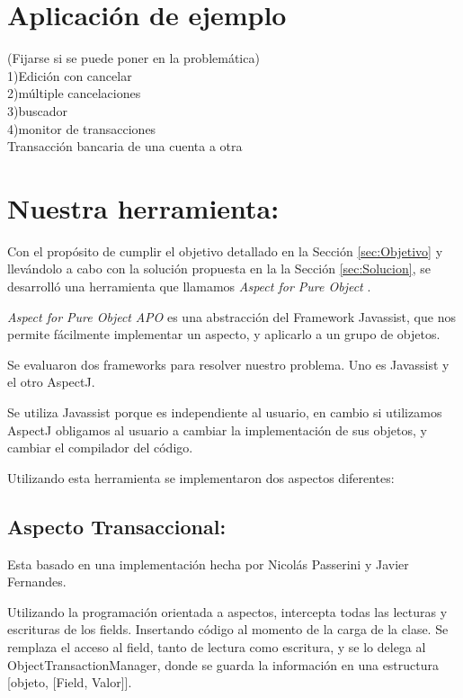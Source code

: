 \section{Aplicación de ejemplo}
(Fijarse si se puede poner en la problemática)\\
1)Edición con cancelar\\
2)múltiple cancelaciones\\
3)buscador\\
4)monitor de transacciones\\

Transacción bancaria de una cuenta a otra


\section{Nuestra herramienta: }

Con el propósito de cumplir el objetivo detallado en la Sección
\ref{sec:Objetivo} y llevándolo a cabo con la solución propuesta en la  la
Sección \ref{sec:Solucion}, se desarrolló una herramienta que llamamos
\emph{Aspect for Pure Object }.

\bigskip 

\emph{ Aspect for Pure Object} \emph{APO} es una abstracción del Framework
Javassist, que nos permite fácilmente implementar un aspecto, y aplicarlo a un grupo de
objetos.

\bigskip 

Se evaluaron dos frameworks para resolver nuestro problema. Uno es Javassist y
el otro AspectJ. \cite{KiczalesHHKPG01}

\bigskip

Se utiliza Javassist porque es independiente al usuario, en cambio si utilizamos
AspectJ obligamos al usuario a cambiar la implementación de sus objetos,
y cambiar el compilador del código. 

\bigskip

Utilizando esta herramienta se implementaron dos aspectos diferentes:

	\subsection{Aspecto Transaccional:} Esta basado en una implementación
	hecha por Nicolás Passerini y Javier Fernandes.
	 
	Utilizando la programación orientada a aspectos, intercepta todas las lecturas
	y escrituras de los fields. Insertando código al momento de la carga de la 
	clase.
	Se remplaza el acceso al field, tanto de lectura como escritura, y se lo delega
	al ObjectTransactionManager, donde se guarda la información en una estructura
	[objeto, [Field, Valor]].
	
